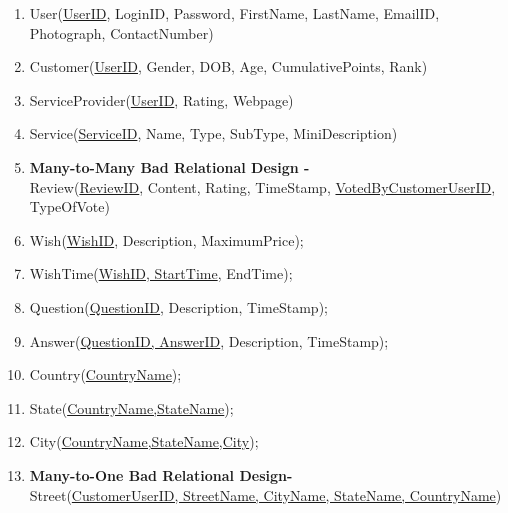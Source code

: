 \documentclass[a4paper]{article}
\begin{document}
\begin{enumerate}

\item User(\underline{UserID}, LoginID, Password, FirstName, LastName, EmailID, Photograph, ContactNumber)

\item Customer(\underline{UserID}, Gender, DOB, Age, CumulativePoints, Rank)

\item ServiceProvider(\underline{UserID}, Rating, Webpage)

\item Service(\underline{ServiceID}, Name, Type, SubType, MiniDescription)

\item  \textbf{Many-to-Many Bad Relational Design -}\\  Review(\underline{ReviewID}, Content, Rating, TimeStamp, \underline{VotedByCustomerUserID}, TypeOfVote)

\item Wish(\underline{WishID}, Description, MaximumPrice);

\item WishTime(\underline{WishID, StartTime}, EndTime);

\item Question(\underline{QuestionID}, Description, TimeStamp);

\item Answer(\underline{QuestionID, AnswerID}, Description, TimeStamp);

\item Country(\underline{CountryName}); 

\item State(\underline{CountryName,StateName});

\item City(\underline{CountryName,StateName,City});

\item \textbf{Many-to-One Bad Relational Design- } \\ Street(\underline{CustomerUserID, StreetName, CityName, StateName, CountryName}) 
\end{enumerate}
\end{document}
